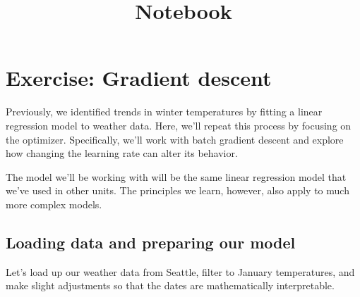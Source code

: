 \documentclass[11pt]{article}
\title{Notebook}
\begin{document}
    
    \maketitle
    
    

    
    \hypertarget{exercise-gradient-descent}{%
\section{Exercise: Gradient descent}\label{exercise-gradient-descent}}

Previously, we identified trends in winter temperatures by fitting a
linear regression model to weather data. Here, we'll repeat this process
by focusing on the optimizer. Specifically, we'll work with batch
gradient descent and explore how changing the learning rate can alter
its behavior.

The model we'll be working with will be the same linear regression model
that we've used in other units. The principles we learn, however, also
apply to much more complex models.

\hypertarget{loading-data-and-preparing-our-model}{%
\subsection{Loading data and preparing our
model}\label{loading-data-and-preparing-our-model}}

Let's load up our weather data from Seattle, filter to January
temperatures, and make slight adjustments so that the dates are
mathematically interpretable.
\end{document}
